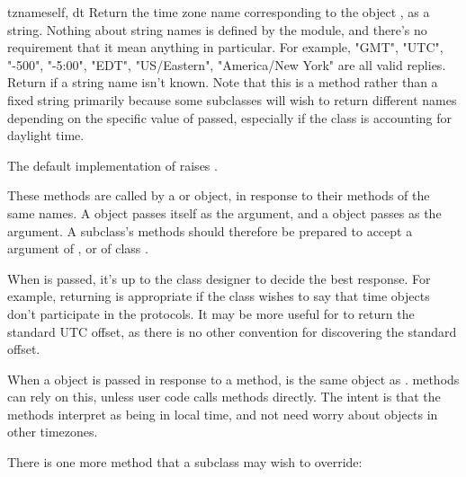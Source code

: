 \begin{methoddesc}[tzinfo]{tzname}{self, dt}
  Return the time zone name corresponding to the 
  object , as a string.
  Nothing about string names is defined by the
   module, and there's no requirement that it mean
  anything in particular.  For example, "GMT", "UTC", "-500", "-5:00",
  "EDT", "US/Eastern", "America/New York" are all valid replies.  Return
   if a string name isn't known.  Note that this is a method
  rather than a fixed string primarily because some 
  subclasses will wish to return different names depending on the specific
  value of  passed, especially if the  class is
  accounting for daylight time.

  The default implementation of  raises
  .
\end{methoddesc}

These methods are called by a  or  object,
in response to their methods of the same names.  A 
object passes itself as the argument, and a  object passes
 as the argument.  A  subclass's methods should
therefore be prepared to accept a  argument of , or of
class .

When  is passed, it's up to the class designer to decide the
best response.  For example, returning  is appropriate if the
class wishes to say that time objects don't participate in the
 protocols.  It may be more useful for 
to return the standard UTC offset, as there is no other convention for
discovering the standard offset.

When a  object is passed in response to a
 method,  is the same object as
.   methods can rely on this, unless
user code calls  methods directly.  The intent is that
the  methods interpret  as being in local time,
and not need worry about objects in other timezones.

There is one more  method that a subclass may wish to
override:

